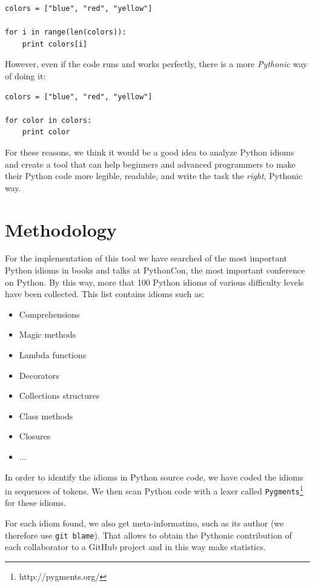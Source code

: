 \documentclass[conference]{IEEEtran}
\begin{document}
\begin{verbatim}
colors = ["blue", "red", "yellow"]

for i in range(len(colors)):
    print colors[i]
\end{verbatim}

However, even if the code runs and works perfectly, there is a more \emph{Pythonic} way of
doing it:

\begin{verbatim}
colors = ["blue", "red", "yellow"]

for color in colors:
    print color
\end{verbatim}

For these reasons, we think it would be a good idea to analyze Python idioms and create a tool that can help beginners and advanced programmers to make their Python code more legible, readable, and write the task the \emph{right}, Pythonic way.

\section{Methodology}

For the implementation of this tool we have searched of the most important Python idioms in books and talks at PythonCon, the most important conference on Python. By this way, more that 100 Python idioms of various difficulty levels have been collected. This list contains idioms such as:

\begin{itemize}
\item Comprehensions
\item Magic methods
\item Lambda functions
\item Decorators
\item Collections structures
\item Class methods
\item Closures
\item ...
\end{itemize}


In order to identify the idioms in Python source code, we have coded the idioms in sequences of tokens. We then scan Python code with a lexer called \texttt{Pygments}\footnote{http://pygments.org/} for these idioms.

For each idiom found, we also get meta-informatino, such as its author (we therefore use \texttt{git blame}). That allows to obtain the Pythonic contribution of each collaborator to a GitHub project and in this way make statistics.
\end{document}
